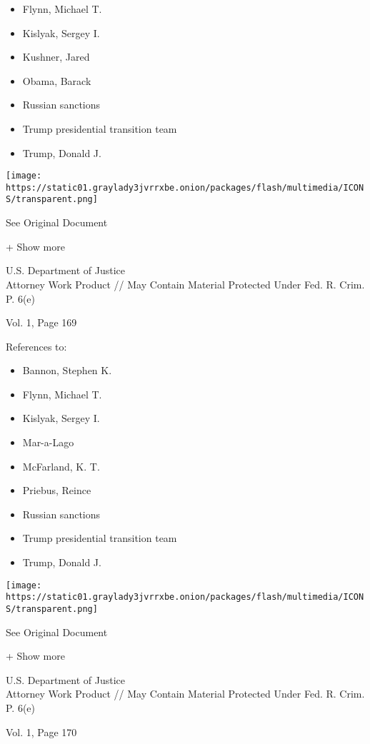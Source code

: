 \begin{itemize}
\tightlist
\item
  Flynn, Michael T.
\item
  Kislyak, Sergey I.
\item
  Kushner, Jared
\item
  Obama, Barack
\item
  Russian sanctions
\item
  Trump presidential transition team
\item
  Trump, Donald J.
\end{itemize}

\protect\hyperlink{}{}

\texttt{[image: https://static01.graylady3jvrrxbe.onion/packages/flash/multimedia/ICONS/transparent.png]}

See Original Document

+ Show more

U.S. Department of Justice\\
Attorney Work Product // May Contain Material Protected Under Fed. R.
Crim. P. 6(e)

Vol. 1, Page 169

References to:

\begin{itemize}
\tightlist
\item
  Bannon, Stephen K.
\item
  Flynn, Michael T.
\item
  Kislyak, Sergey I.
\item
  Mar-a-Lago
\item
  McFarland, K. T.
\item
  Priebus, Reince
\item
  Russian sanctions
\item
  Trump presidential transition team
\item
  Trump, Donald J.
\end{itemize}

\protect\hyperlink{}{}

\texttt{[image: https://static01.graylady3jvrrxbe.onion/packages/flash/multimedia/ICONS/transparent.png]}

See Original Document

+ Show more

U.S. Department of Justice\\
Attorney Work Product // May Contain Material Protected Under Fed. R.
Crim. P. 6(e)

Vol. 1, Page 170

